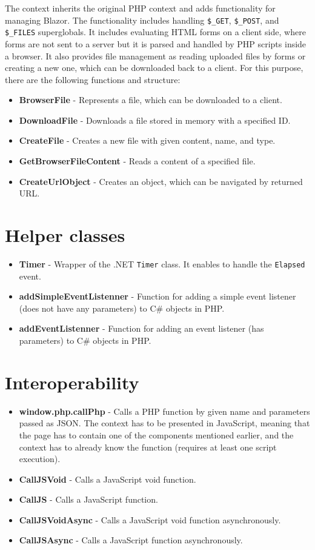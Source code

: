 The context inherits the original PHP context and adds functionality for managing Blazor. The  functionality includes handling \texttt{\$\_GET}, \texttt{\$\_POST}, and \texttt{\$\_FILES} superglobals. It includes evaluating HTML forms on a client side, where forms are not sent to a server but it is parsed and handled by PHP scripts inside a browser. It also provides file management as reading uploaded files by forms or creating a new one, which can be downloaded back to a client.  For this purpose, there are the following functions and structure:
\par
\begin{itemize}
\item \textbf{BrowserFile} - Represents a file, which can be downloaded to a client.
\item \textbf{DownloadFile} - Downloads a file stored in memory with a specified ID.
\item \textbf{CreateFile} - Creates a new file with given content, name, and type.
\item \textbf{GetBrowserFileContent} - Reads a content of a specified file.
\item \textbf{CreateUrlObject} - Creates an object, which can be navigated by returned URL.
\end{itemize}

\section{Helper classes}

\begin{itemize}
\item \textbf{Timer} - Wrapper of the .NET \texttt{Timer} class. It enables to handle the \texttt{Elapsed} event.
\item \textbf{addSimpleEventListenner} - Function for adding a simple event listener (does not have any parameters) to C\# objects in PHP.
\item \textbf{addEventListenner} - Function for adding an event listener (has parameters) to C\# objects in PHP.
\end{itemize}

\section{Interoperability}

\begin{itemize}
\item \textbf{window.php.callPhp} - Calls a PHP function by given name and parameters passed as JSON. The context has to be presented in JavaScript, meaning that the page has to contain one of the components mentioned earlier, and the context has to already know the function (requires at least one script execution).
\item \textbf{CallJSVoid} - Calls a JavaScript void function.
\item \textbf{CallJS} - Calls a JavaScript function.
\item \textbf{CallJSVoidAsync} - Calls a JavaScript void function asynchronously.
\item \textbf{CallJSAsync} - Calls a JavaScript function asynchronously.
\end{itemize}
